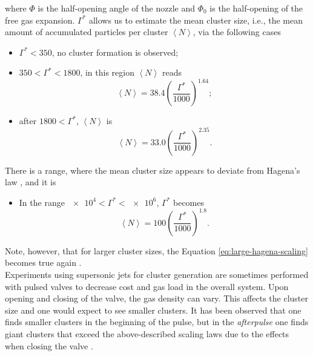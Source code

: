 where $\Phi$ is the half-opening angle of the nozzle and $\Phi_{0}$ is the half-opening of the free gas expansion. $\Gamma^{*}$ allows us to estimate the mean cluster size, i.e., the mean amount of accumulated particles per cluster $\left\langle N\right\rangle$, via the following cases
\begin{itemize}
	\item $\Gamma^{*} < 350$, no cluster formation is observed;
	\item $350 < \Gamma^{*} < 1800$, in this region $\left\langle N\right\rangle$ reads \citep{Buck-1996-JChemPhys}
		\begin{equation}
		\left\langle N\right\rangle = 38.4 \left(\frac{\Gamma^{*}}{1000}\right)^{1.64};
		\label{eq:intermediate-hagena-scaling}
		\end{equation}
	\item after $1800 < \Gamma^{*}$, $\left\langle N\right\rangle$ is
		\begin{equation}
		\left\langle N\right\rangle = 33.0 \left(\frac{\Gamma^{*}}{1000}\right)^{2.35}.
		\label{eq:large-hagena-scaling}
		\end{equation}
\end{itemize}
There is a range, where the mean cluster size appears to deviate from Hagena's law \citep{Dorchies-2003-PRA}, and it is
\begin{itemize}
	\item In the range $\num{e4} < \Gamma^{*} < \num{e6}$, $\Gamma^{*}$ becomes
		\begin{equation}
		\left\langle N\right\rangle = 100 \left(\frac{\Gamma^{*}}{1000}\right)^{1.8}.
		\label{eq:dorchies-scaling}
		\end{equation}
\end{itemize}
Note, however, that for larger cluster sizes, the Equation \eqref{eq:large-hagena-scaling} becomes true again \citep{Hagena-1992-RSI,Bush-1998-JPhysChemA}.\\[1\baselineskip]
%
Experiments using supersonic jets for cluster generation are sometimes performed with pulsed valves to decrease cost and gas load in the overall system. Upon opening and closing of the valve, the gas density can vary. This affects the cluster size and one would expect to see smaller clusters. It has been observed that one finds smaller clusters in the beginning of the pulse, but in the \textit{afterpulse} one finds giant clusters that exceed the above-described scaling laws due to the effects when closing the valve \citep{Rupp-2014-JCP}.\\[1\baselineskip]

